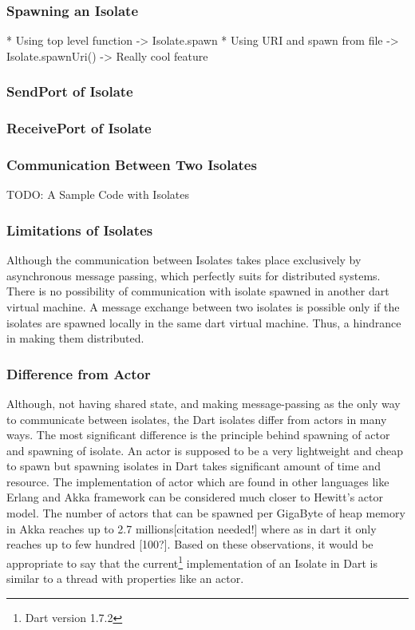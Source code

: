   \subsubsection{Spawning an Isolate}
  * Using top level function -> Isolate.spawn
  * Using URI and spawn from file -> Isolate.spawnUri()
    -> Really cool feature

  \subsubsection{SendPort of Isolate}
  \subsubsection{ReceivePort of Isolate}
  \subsubsection{Communication Between Two Isolates}
  TODO: A Sample Code with Isolates

  \subsubsection{Limitations of Isolates}
  Although the communication between Isolates takes place exclusively by asynchronous message passing, which perfectly suits for distributed systems. There is no possibility of communication with isolate spawned in another dart virtual machine. A message exchange between two isolates is possible only if the isolates are spawned locally in the same dart virtual machine. Thus, a hindrance in making them distributed.

  \subsubsection{Difference from Actor}
Although, not having shared state, and making message-passing as the only way to communicate between isolates, the Dart isolates differ from actors in many ways. The most significant difference is the principle behind spawning of actor and spawning of isolate. An actor is supposed to be a very lightweight and cheap to spawn but spawning isolates in Dart takes significant amount of time and resource. The implementation of actor which are found in other languages like Erlang and Akka framework can be considered much closer to Hewitt's actor model. The number of actors that can be spawned per GigaByte of heap memory in Akka reaches up to 2.7 millions[citation needed!] where as in dart it only reaches up to few hundred [100?]. Based on these observations, it would be appropriate to say that the current\footnote{Dart version 1.7.2} implementation of an Isolate in Dart is \textemdash{} similar to a thread with properties like an actor.

